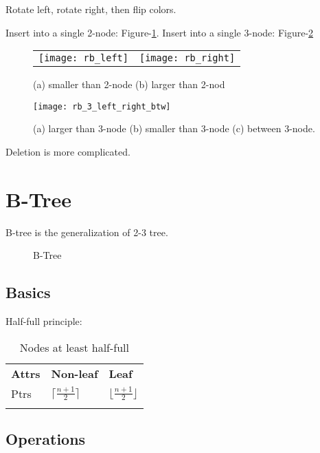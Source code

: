 Rotate left, rotate right, then flip colors.

 Insert into a single 2-node: Figure-\ref{fig:rb_2}. Insert into a single 3-node: Figure-\ref{fig:rb_3}
\begin{figure}[hbtp]
\begin{tabular}{cc}
  \texttt{[image: rb\_left]} &
  \texttt{[image: rb\_right]}\\
\end{tabular}
\caption{(a) smaller than 2-node (b) larger than 2-nod}
\label{fig:rb_2}
\end{figure}

\begin{figure}[hbtp]
        \centerline{\texttt{[image: rb\_3\_left\_right\_btw]}}
        \caption{(a) larger than 3-node (b) smaller than 3-node (c) between 3-node.}
    \label{fig:rb_3}
\end{figure}

 Deletion is more complicated. 

\section{B-Tree}
B-tree is the generalization of 2-3 tree. 
\begin{figure*}[hbtp]
\centering
{}
\caption{B-Tree}
\label{fig:b-tree}
\end{figure*}
\subsection{Basics}
Half-full principle: 

\begin{table}
\begin{tabular}{lll}
\hline\noalign{\smallskip}
\textbf{Attrs} & \textbf{Non-leaf} & \textbf{Leaf} \\
\noalign{\smallskip}\hline\noalign{\smallskip}
Ptrs & $\lceil\frac{n+1}{2}\rceil$ & $\lfloor\frac{n+1}{2}\rfloor$ \\
\noalign{\smallskip}\hline\noalign{\smallskip}
\end{tabular}
\caption{Nodes at least half-full}
\end{table}

\subsection{Operations}
